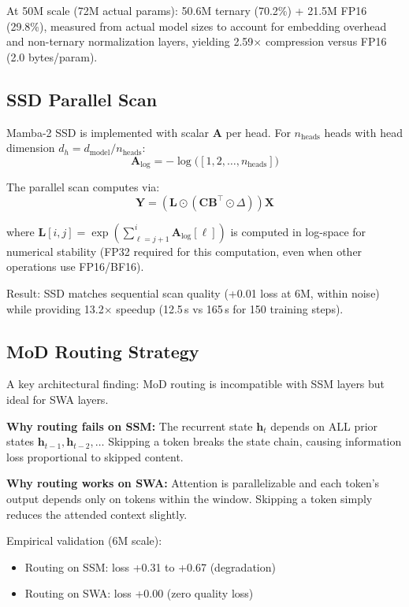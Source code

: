 \documentclass{article}
\begin{document}
At 50M scale (72M actual params): 50.6M ternary (70.2\%) + 21.5M FP16 (29.8\%), measured from actual model sizes to account for embedding overhead and non-ternary normalization layers, yielding 2.59$\times$ compression versus FP16 (2.0 bytes/param).

\subsection{SSD Parallel Scan}
\label{sec:ssd_scan}

Mamba-2 SSD is implemented with scalar $\mathbf{A}$ per head. For $n_\text{heads}$ heads with head dimension $d_h = d_\text{model} / n_\text{heads}$:
\begin{equation}
\mathbf{A}_\text{log} = -\log\bigl([1, 2, \ldots, n_\text{heads}]\bigr)
\end{equation}

The parallel scan computes via:
\begin{equation}
\mathbf{Y} = (\mathbf{L} \odot (\mathbf{C} \mathbf{B}^\top \odot \Delta)) \mathbf{X}
\end{equation}

where $\mathbf{L}[i,j] = \exp(\sum_{\ell=j+1}^{i} \mathbf{A}_\text{log}[\ell])$ is computed in log-space for numerical stability (FP32 required for this computation, even when other operations use FP16/BF16).

Result: SSD matches sequential scan quality (+0.01 loss at 6M, within noise) while providing 13.2$\times$ speedup (12.5\,s vs 165\,s for 150 training steps).

\subsection{MoD Routing Strategy}

A key architectural finding: MoD routing is incompatible with SSM layers but ideal for SWA layers.

\textbf{Why routing fails on SSM:} The recurrent state $\mathbf{h}_t$ depends on ALL prior states $\mathbf{h}_{t-1}, \mathbf{h}_{t-2}, \ldots$ Skipping a token breaks the state chain, causing information loss proportional to skipped content.

\textbf{Why routing works on SWA:} Attention is parallelizable and each token's output depends only on tokens within the window. Skipping a token simply reduces the attended context slightly.

Empirical validation (6M scale):
\begin{itemize}
    \item Routing on SSM: loss +0.31 to +0.67 (degradation)
    \item Routing on SWA: loss +0.00 (zero quality loss)
\end{itemize}
\end{document}
